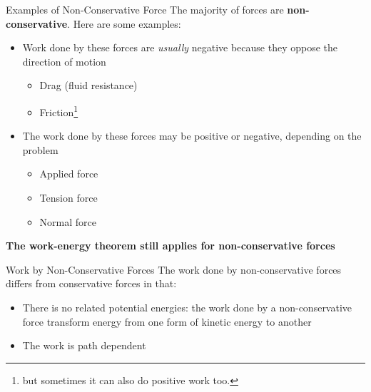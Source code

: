 \documentclass[12pt,compress,aspectratio=169]{beamer}
\begin{document}
\begin{frame}{Examples of Non-Conservative Force}
  The majority of forces are \textbf{non-conservative}. Here are some examples:
  \begin{itemize}
  \item Work done by these forces are \emph{usually} negative because they
    oppose the direction of motion
    \begin{itemize}
    \item Drag (fluid resistance)
    \item Friction\footnote{but sometimes it can also do positive work too.}
    \end{itemize}
  \item The work done by these forces may be positive or negative, depending on
    the problem
    \begin{itemize}
    \item Applied force
    \item Tension force
    \item Normal force
    \end{itemize}
  \end{itemize}
  \textbf{The work-energy theorem still applies for non-conservative forces}
\end{frame}



\begin{frame}{Work by Non-Conservative Forces}
  The work done by non-conservative forces differs from conservative forces in
  that:
  \begin{itemize}
  \item There is no related potential energies: the work done by a
    non-conservative force transform energy from one form of kinetic energy to
    another
  \item The work is path dependent
  \end{itemize}
\end{frame}
\end{document}
